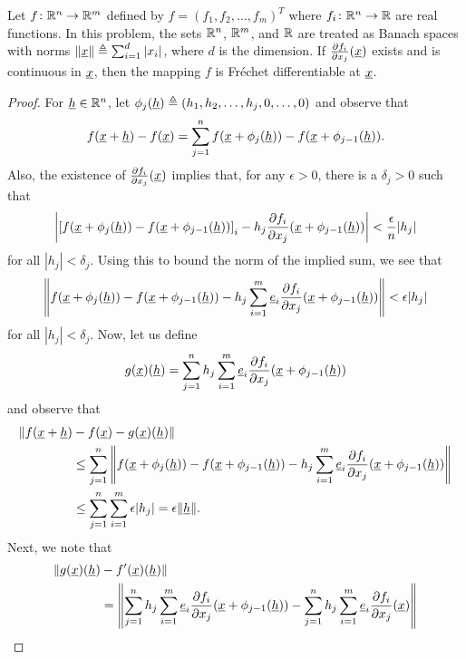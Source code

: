 \iffalse
\begin{theorem}
Let $f\colon \mathbb{R}^n \to \mathbb{R}^m$ defined by $f = (f_1,f_2,\ldots,f_m)^T$ where $f_i \colon \mathbb{R}^n \to \mathbb{R}$ are real functions.
In this problem, the sets $\mathbb{R}^n$, $\mathbb{R}^m$, and $\mathbb{R}$ are treated as Banach spaces with norms
$\|\underline{x} \| \triangleq \sum_{i=1}^d |x_i|$, where $d$ is the dimension.
If $\frac{\partial f_i}{\partial x_j} (\underline{x})$ exists and is continuous in $\underline{x}$, then the mapping $f$ is Fr\'{e}chet differentiable  at $\underline{x}$.
\end{theorem}
\begin{proof}
For $\underline{h} \in \mathbb{R}^n$, let $\phi_j (\underline{h}) \triangleq (h_1,h_2,\ldots,h_j,0,\ldots,0)$ and observe that
\[ f(\underline{x}+\underline{h}) - f(\underline{x}) = \sum_{j=1}^n f(\underline{x}+\phi_j (\underline{h})) - f(\underline{x}+\phi_{j-1}(\underline{h})). \]
Also, the existence of $\frac{\partial f_i}{\partial x_j} (\underline{x})$ implies that, for any $\epsilon >0$, there is a $\delta_j > 0$ such that
\[  \left| \left[ f(\underline{x}+\phi_j (\underline{h})) - f(\underline{x}+\phi_{j-1}(\underline{h})) \right]_i  - h_j \frac{\partial f_i}{\partial x_j} (\underline{x}+\phi_{j-1}(\underline{h})) \right| < \frac{\epsilon}{n} |h_j| \]
for all $|h_j| < \delta_j$.
Using this to bound the norm of the implied sum, we see that
\[  \left\| f(\underline{x}+\phi_j (\underline{h})) - f(\underline{x}+\phi_{j-1}(\underline{h})) -  h_j \sum_{i=1}^m \underline{e}_i \frac{\partial f_i}{\partial x_j}  (\underline{x}+\phi_{j-1}(\underline{h})) \right\|  < \epsilon |h_j| \]
for all $|h_j| < \delta_j$.
Now, let us define
\[ g(\underline{x})(\underline{h}) = \sum_{j=1}^n h_j \sum_{i=1}^m \underline{e}_i \frac{\partial f_i}{\partial x_j} (\underline{x}+\phi_{j-1}(\underline{h})) \]
and observe that
\begin{align*}
\| f(\underline{x}+\underline{h}) & - f(\underline{x}) - g(\underline{x}) (\underline{h}) \|  \\
&\leq \sum_{j=1}^n \left\| f(\underline{x}+\phi_j (\underline{h})) - f(\underline{x}+\phi_{j-1}(\underline{h})) - h_j \sum_{i=1}^m \underline{e}_i \frac{\partial f_i}{\partial x_j} (\underline{x}+\phi_{j-1}(\underline{h})) \right\| \\
& \leq \sum_{j=1}^n \sum_{i=1}^m \epsilon |h_j| = \epsilon \| \underline{h} \|.
\end{align*}
Next, we note that
\begin{align*}
\| g(\vecnot{x})(\vecnot{h}) &- f'(\vecnot{x})(\vecnot{h}) \| \\
&= \left\| \sum_{j=1}^n h_j \sum_{i=1}^m \vecnot{e}_i \frac{\partial f_i}{\partial x_j} (\vecnot{x}+\phi_{j-1}(\vecnot{h})) - \sum_{j=1}^n h_j \sum_{i=1}^m \vecnot{e}_i \frac{\partial f_i}{\partial x_j} (\vecnot{x}) \right\| \\

\end{align*}
\end{proof}
